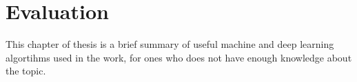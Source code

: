 \section{Evaluation}
\label{chap:evaluation}
This chapter of thesis is a brief summary of useful machine and deep learning algortihms used in the work, for ones who does not have enough knowledge about the topic.
